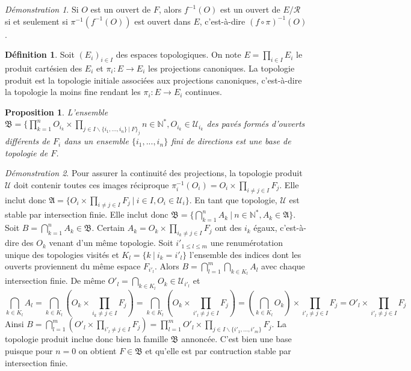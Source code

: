 \documentclass[a4paper, 11pt, french]{book}
\theoremstyle{plain} %
\newtheorem{proposition}{Proposition}
\theoremstyle{definition} %
\newtheorem{definition}{Définition}
\theoremstyle{remark} %
\newtheorem*{demonstration}{Démonstration}
\renewcommand{\setminus}{\backslash}
\newcommand{\1}{\mathds{1}}
\newcommand{\inv}[1]{#1^{-1}}
\newcommand{\N}{\mathbb{N}}
\renewcommand{\frak}[1]{\mathfrak{#1}}
\newcommand{\scr}[1]{\mathscr{#1}}
\newcommand\ens[2]{\{#1 \ |\ #2\}}
\begin{document}
\begin{demonstration}
	Si $O$ est un ouvert de $F$, alors $\inv{f}(O)$ est un ouvert de $E/\mathcal{R}$ si et seulement si $\inv{\pi}(\inv{f}(O))$ est ouvert dans $E$, c'est-à-dire $\inv{(f\circ\pi)}(O)$.
\end{demonstration}

\begin{definition}
	Soit $(E_i)_{i\in I}$ des espaces topologiques.
	On note $E=\prod_{i\in I} E_i$ le produit cartésien des $E_i$ et $\pi_i\colon E\rightarrow E_i$ les projections canoniques.
	La topologie produit est la topologie initiale associées aux projections canoniques, c'est-à-dire la topologie la moins fine rendant les $\pi_i\colon E\rightarrow E_i$ continues.
\end{definition}

\begin{proposition}
	L'ensemble $\frak{B}=\{\prod_{k=1}^nO_{i_k}\times\prod_{j\in I\setminus\ens{i_1, ..., i_n\}}F_j}{n\in\N^*, O_{i_k}\in\scr{U}_{i_k}}$ des pavés formés d'ouverts différents de $F_i$ dans un ensemble $\{i_1,...,i_n\}$ fini de directions est une base de topologie de $F$.
\end{proposition}

\begin{demonstration}
	Pour assurer la continuité des projections, la topologie produit $\scr{U}$ doit contenir toutes ces images réciproque $\inv{\pi_i}(O_i)=O_i\times\prod_{i\neq j\in I}F_j$.
	Elle inclut donc $\frak{A}=\ens{O_i\times\prod_{i\neq j\in I}F_j}{i\in I, O_i\in\scr{U}_i}$.
	En tant que topologie, $\scr{U}$ est stable par intersection finie.
	Elle inclut donc $\frak{B}=\ens{\bigcap_{k=1}^nA_k}{n\in\N^*, A_k\in\frak{A}}$.
	Soit $B=\bigcap_{k=1}^nA_k\in\frak{B}$.
	Certain $A_k=O_k\times\prod_{i_k\neq j\in I}F_j$ ont des $i_k$ égaux, c'est-à-dire des $O_k$ venant d'un même topologie.
	Soit $i'_{1\leqslant l\leqslant m}$ une renumérotation unique des topologies visités et $K_l=\ens{k}{i_k=i'_l}$ l'ensemble des indices dont les ouverts proviennent du même espace $F_{i'_l}$.
	Alors $B=\bigcap_{l=1}^m\bigcap_{k\in K_l}A_l$ avec chaque intersection finie.
	De même $O'_l=\bigcap_{k\in K_l}O_k\in\scr{U}_{i'_l}$ et
	$$
		\bigcap_{k\in K_l}A_l
		=\bigcap_{k\in K_l}(O_k\times\prod_{i_k\neq j\in I}F_j)
		=\bigcap_{k\in K_l}(O_k\times\prod_{i'_l\neq j\in I}F_j)
		=(\bigcap_{k\in K_l}O_k)\times\prod_{i'_l\neq j\in I}F_j
		=O'_l\times\prod_{i'_l\neq j\in I}F_j
	$$
	Ainsi $B=\bigcap_{l=1}^m(O'_l\times\prod_{i'_l\neq j\in I}F_j)=\prod_{l=1}^mO'_l\times\prod_{j\in I\setminus\{i'_1,...,i'_m\}}F_j$.
	La topologie produit inclue donc bien la famille $\frak{B}$ annoncée.
	C'est bien une base puisque pour $n=0$ on obtient $F\in\frak{B}$ et qu'elle est par contruction stable par intersection finie.
\end{demonstration}
\end{document}
